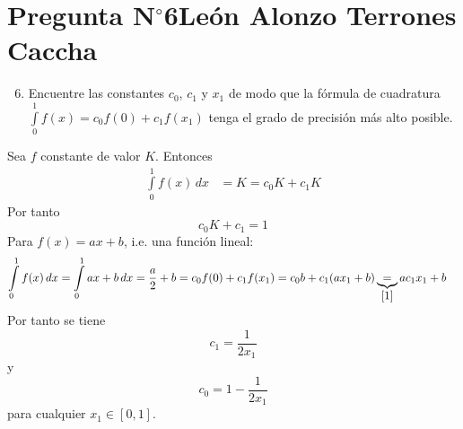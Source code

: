 \section{Pregunta N$^{\circ}$6\qquad León Alonzo Terrones Caccha}

\begin{frame}
    \begin{enumerate}\setcounter{enumi}{5}
        \item

               Encuentre las constantes $c_0$, $c_1$ y $x_1$ de modo que la fórmula de cuadratura
              \begin{math}
                  \displaystyle
                  \int\limits_{0}^{1}
                  f(x)=c_0f(0)+c_1f(x_1)
              \end{math}
              tenga el grado de precisión más alto posible.

            
    \end{enumerate}

    \begin{solution}
        Sea $f$ constante de valor $K$. Entonces
        \begin{align*}
        \displaystyle\int\limits_{0}^{1}f(x)\,dx&=K=c_0K+c_1K
        \end{align*}
   Por tanto 
   \begin{equation}\label{1}
       c_0K+c_1=1
   \end{equation}
        Para $f(x)=ax+b$, i.e. una función lineal:
        \begin{align*}
        \displaystyle\int\limits_{0}^{1}f(x)\,dx&=\displaystyle\int\limits_{0}^{1}ax+b\,dx=\frac{a}{2}+b=c_0f(0)+c_1f(x_1)=c_0b+c_1(ax_1+b)\underbrace{=}_{\ref{1}}ac_1x_1+b
        \end{align*}
        Por tanto se tiene
        \begin{equation*}
            c_1=\frac{1}{2x_1}
        \end{equation*}
        y 
        \begin{equation*}
            c_0=1-\frac{1}{2x_1}
        \end{equation*}
        para cualquier $x_1\in [0,1]$.

        
    \end{solution}
\end{frame}



